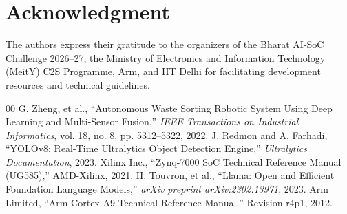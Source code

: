 \documentclass[conference]{IEEEtran}
\begin{document}
\section*{Acknowledgment}
The authors express their gratitude to the organizers of the Bharat AI-SoC Challenge 2026--27, the Ministry of Electronics and Information Technology (MeitY) C2S Programme, Arm, and IIT Delhi for facilitating development resources and technical guidelines.

\begin{thebibliography}{00}
 G. Zheng, et al., ``Autonomous Waste Sorting Robotic System Using Deep Learning and Multi-Sensor Fusion,'' \textit{IEEE Transactions on Industrial Informatics}, vol. 18, no. 8, pp. 5312--5322, 2022.
 J. Redmon and A. Farhadi, ``YOLOv8: Real-Time Ultralytics Object Detection Engine,'' \textit{Ultralytics Documentation}, 2023.
 Xilinx Inc., ``Zynq-7000 SoC Technical Reference Manual (UG585),'' AMD-Xilinx, 2021.
 H. Touvron, et al., ``Llama: Open and Efficient Foundation Language Models,'' \textit{arXiv preprint arXiv:2302.13971}, 2023.
 Arm Limited, ``Arm Cortex-A9 Technical Reference Manual,'' Revision r4p1, 2012.
\end{thebibliography}
\end{document}
